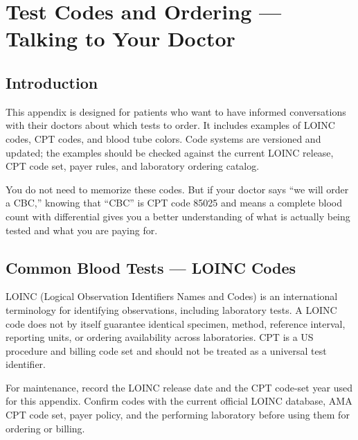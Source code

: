 \chapter{Test Codes and Ordering --- Talking to Your Doctor}
\label{app:test_codes}

\clearpage
\section{Introduction}

This appendix is designed for patients who want to have informed conversations with their doctors about which tests to order. It includes examples of LOINC codes, CPT codes, and blood tube colors. Code systems are versioned and updated; the examples should be checked against the current LOINC release, CPT code set, payer rules, and laboratory ordering catalog.

You do not need to memorize these codes. But if your doctor says ``we will order a CBC,'' knowing that ``CBC'' is CPT code 85025 and means a complete blood count with differential gives you a better understanding of what is actually being tested and what you are paying for.

\clearpage
\section{Common Blood Tests --- LOINC Codes}

LOINC (Logical Observation Identifiers Names and Codes) is an international terminology for identifying observations, including laboratory tests. A LOINC code does not by itself guarantee identical specimen, method, reference interval, reporting units, or ordering availability across laboratories. CPT is a US procedure and billing code set and should not be treated as a universal test identifier.

For maintenance, record the LOINC release date and the CPT code-set year used for this appendix. Confirm codes with the current official LOINC database, AMA CPT code set, payer policy, and the performing laboratory before using them for ordering or billing.

